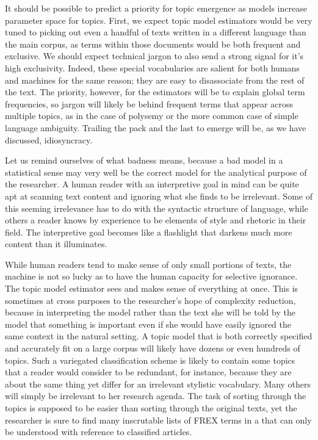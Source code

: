 \documentclass[]{book}
\theoremstyle{definition}
\theoremstyle{definition}
\theoremstyle{definition}
\theoremstyle{remark}
\begin{document}
It should be possible to predict a priority for topic emergence as
models increase parameter space for topics. First, we expect topic model
estimators would be very tuned to picking out even a handful of texts
written in a different language than the main corpus, as terms within
those documents would be both frequent and exclusive. We should expect
technical jargon to also send a strong signal for it's high exclusivity.
Indeed, these special vocabularies are salient for both humans and
machines for the same reason; they are easy to disassociate from the
rest of the text. The priority, however, for the estimators will be to
explain global term frequencies, so jargon will likely be behind
frequent terms that appear across multiple topics, as in the case of
polysemy or the more common case of simple language ambiguity. Trailing
the pack and the last to emerge will be, as we have discussed,
idiosyncracy.

Let us remind ourselves of what badness means, because a bad model in a
statistical sense may very well be the correct model for the analytical
purpose of the researcher. A human reader with an interpretive goal in
mind can be quite apt at scanning text content and ignoring what she
finds to be irrelevant. Some of this seeming irrelevance has to do with
the syntactic structure of language, while others a reader knows by
experience to be elements of style and rhetoric in their field. The
interpretive goal becomes like a flashlight that darkens much more
content than it illuminates.

While human readers tend to make sense of only small portions of texts,
the machine is not so lucky as to have the human capacity for selective
ignorance. The topic model estimator sees and makes sense of everything
at once. This is sometimes at cross purposes to the researcher's hope of
complexity reduction, because in interpreting the model rather than the
text she will be told by the model that something is important even if
she would have easily ignored the same context in the natural setting. A
topic model that is both correctly specified and accurately fit on a
large corpus will likely have dozens or even hundreds of topics. Such a
variegated classification scheme is likely to contain some topics that a
reader would consider to be redundant, for instance, because they are
about the same thing yet differ for an irrelevant stylistic vocabulary.
Many others will simply be irrelevant to her research agenda. The task
of sorting through the topics is supposed to be easier than sorting
through the original texts, yet the researcher is sure to find many
inscrutable lists of FREX terms in a that can only be understood with
reference to classified articles.
\end{document}

